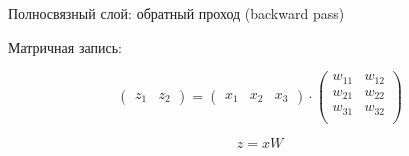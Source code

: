 \documentclass[notes,12pt, aspectratio=169]{beamer}
\newenvironment{wideitemize}{\itemize\addtolength{\itemsep}{10pt}}{\enditemize}
\begin{document}
\begin{frame}{Полносвязный слой: обратный проход (backward pass)}
\begin{wideitemize}

	\item Матричная запись: 
	
	\begin{equation*}
	\begin{pmatrix} z_1 & z_2 \end{pmatrix}  = \begin{pmatrix} x_1 & x_2 & x_3  \end{pmatrix}  \cdot  \begin{pmatrix} w_{11} & w_{12} \\ w_{21} & w_{22} \\ w_{31}  & w_{32} \\  \end{pmatrix}
	\end{equation*}
	
	\[ 
	z  = x W 
	\]


\end{wideitemize}
\end{frame}
\end{document}
